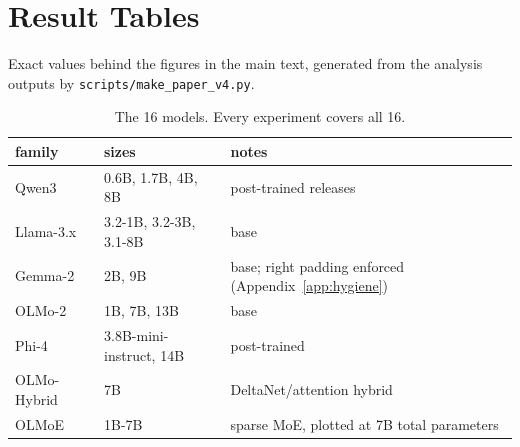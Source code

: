 \section{Result Tables}
\label{app:tables}

Exact values behind the figures in the main text, generated from the analysis outputs by
\texttt{scripts/make\_paper\_v4.py}.

\begin{table}[!ht]
  \centering\footnotesize
  \setlength{\tabcolsep}{4pt}
  \begin{tabular}{@{}lll@{}}
    \toprule
    family & sizes & notes \\
    \midrule
    Qwen3 & 0.6B, 1.7B, 4B, 8B & post-trained releases \\
    Llama-3.x & 3.2-1B, 3.2-3B, 3.1-8B & base \\
    Gemma-2 & 2B, 9B & base; right padding enforced (Appendix~\ref{app:hygiene}) \\
    OLMo-2 & 1B, 7B, 13B & base \\
    Phi-4 & 3.8B-mini-instruct, 14B & post-trained \\
    OLMo-Hybrid & 7B & DeltaNet/attention hybrid \\
    OLMoE & 1B-7B & sparse MoE, plotted at 7B total parameters \\
    \bottomrule
  \end{tabular}
  \caption{The 16 models. Every experiment covers all 16.}
  \label{tab:models}
\end{table}

\begin{table}[!ht]
  \centering\footnotesize
  \setlength{\tabcolsep}{4pt}
  \resizebox{\textwidth}{!}{}
  \caption{Accuracy above the word-only nuisance floor (held-out layer selection), mean over the 16
    models, with the number of models above the floor in parentheses (Figure~\ref{fig:store}).
    ``Word'' columns probe the query word's tokens in the neutral sentence (last token, or mean over
    the word's tokens); ``answer'' columns probe the final prompt token. For
    \texttt{count\_distinct\_lm} the floor equals the majority baseline because the letter set,
    which determines the answer, is excluded as an oracle.}
  \label{tab:store}
\end{table}

\begin{table}[!ht]
  \centering\footnotesize
  \setlength{\tabcolsep}{3.2pt}
  \resizebox{\textwidth}{!}{}
  \caption{Question$\times$scale interaction (Figure~\ref{fig:twophase}b): slope per decade of
    parameters of (question arm $-$ neutral arm) at the answer position. ``All layers'' uses
    held-out layer selection; the permutation $p$ is followed by its Holm-adjusted value across the
    four tasks. ``Late'' and ``early'' restrict each arm to layers at relative depth $\geq 0.5$ or
    $\leq 0.25$ (maximum over the restricted layers); the late $p$ is Holm-adjusted across the four
    tasks. Family CI: 95\% interval from resampling model families.}
  \label{tab:interaction}
\end{table}

